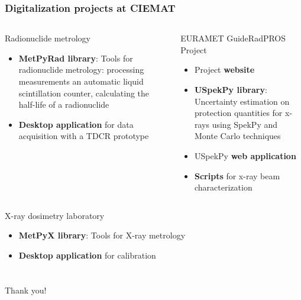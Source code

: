 \documentclass{beamer}
\begin{document}
    \begin{frame}
        \frametitle{Digitalization projects at CIEMAT}
        \begin{columns}[T]
            \begin{block}{Radionuclide metrology}
                \footnotesize
                \begin{itemize}
                    \item \textbf{MetPyRad library}: Tools for radionuclide metrology: processing measurements an automatic liquid scintillation counter, calculating the half-life of a radionuclide
                    {\color{blue} \href{https://lmri-met.github.io/metpyrad/}{\faExternalLink}}
                    \item \textbf{Desktop application} for data acquisition with a TDCR prototype
                \end{itemize}
            \end{block}

            \begin{block}{EURAMET GuideRadPROS Project}
                \footnotesize
                \begin{itemize}
                    \item Project \textbf{website} {\color{blue} \href{https://lmri-met.github.io/sites-guideradpros/}{\faExternalLink}}
                    \item \textbf{USpekPy library}: Uncertainty estimation on protection quantities for x-rays using SpekPy and Monte Carlo techniques
                    {\color{blue} \href{https://github.com/lmri-met/uspekpy}{\faExternalLink}}
                    \item USpekPy \textbf{web application}
                    \item \textbf{Scripts} for x-ray beam characterization
                \end{itemize}
            \end{block}
        \end{columns}
        \centering
        \begin{minipage}{0.95\textwidth}
            \begin{block}{X-ray dosimetry laboratory}
                \footnotesize
                \begin{itemize}
                    \item \textbf{MetPyX library}: Tools for X-ray metrology
                    \item \textbf{Desktop application} for calibration
                \end{itemize}
            \end{block}
        \end{minipage}
    \end{frame}

    \section{}

    \begin{frame}
        \begin{block}{}
            \centering
            Thank you!
        \end{block}
    \end{frame}
\end{document}
